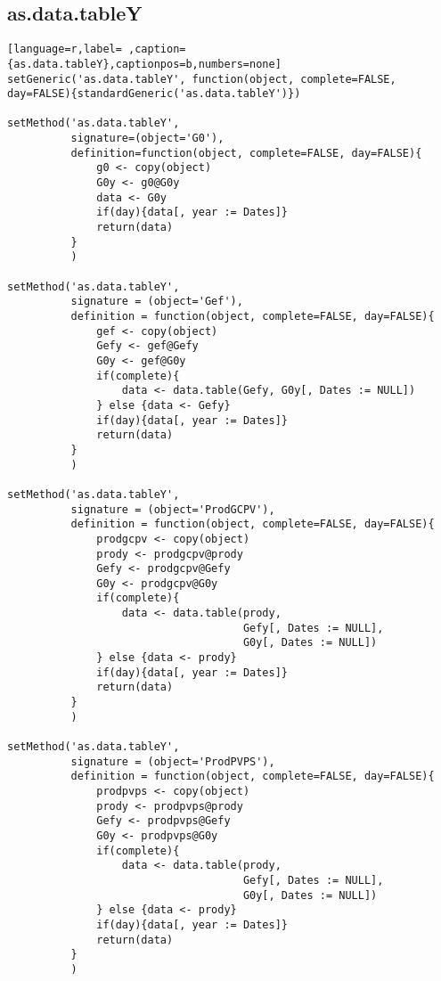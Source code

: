 \subsection{as.data.tableY}
\label{sec:org1b3aa05}
\label{subsec:as.data.tabley}
\begin{lstlisting}[language=r,label= ,caption={as.data.tableY},captionpos=b,numbers=none]
setGeneric('as.data.tableY', function(object, complete=FALSE, day=FALSE){standardGeneric('as.data.tableY')})

setMethod('as.data.tableY',
          signature=(object='G0'),
          definition=function(object, complete=FALSE, day=FALSE){
              g0 <- copy(object)
              G0y <- g0@G0y
              data <- G0y
              if(day){data[, year := Dates]}
              return(data)
          }
          )

setMethod('as.data.tableY',
          signature = (object='Gef'),
          definition = function(object, complete=FALSE, day=FALSE){
              gef <- copy(object)
              Gefy <- gef@Gefy
              G0y <- gef@G0y
              if(complete){
                  data <- data.table(Gefy, G0y[, Dates := NULL])
              } else {data <- Gefy}
              if(day){data[, year := Dates]}
              return(data)
          }
          )

setMethod('as.data.tableY',
          signature = (object='ProdGCPV'),
          definition = function(object, complete=FALSE, day=FALSE){
              prodgcpv <- copy(object)
              prody <- prodgcpv@prody
              Gefy <- prodgcpv@Gefy
              G0y <- prodgcpv@G0y
              if(complete){
                  data <- data.table(prody,
                                     Gefy[, Dates := NULL],
                                     G0y[, Dates := NULL])       
              } else {data <- prody}
              if(day){data[, year := Dates]}
              return(data)
          }
          )

setMethod('as.data.tableY',
          signature = (object='ProdPVPS'),
          definition = function(object, complete=FALSE, day=FALSE){
              prodpvps <- copy(object)
              prody <- prodpvps@prody
              Gefy <- prodpvps@Gefy
              G0y <- prodpvps@G0y
              if(complete){
                  data <- data.table(prody,
                                     Gefy[, Dates := NULL],
                                     G0y[, Dates := NULL])       
              } else {data <- prody}
              if(day){data[, year := Dates]}
              return(data)
          }
          )
\end{lstlisting}
